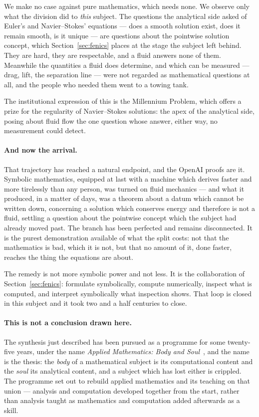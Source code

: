 \documentclass[11pt]{article}
\begin{document}
We make no case against pure mathematics, which needs none. We observe only what the division did to
\emph{this} subject. The questions the analytical side asked of Euler's and Navier--Stokes' equations
--- does a smooth solution exist, does it remain smooth, is it unique --- are questions about the
pointwise solution concept, which Section~\ref{sec:fenics} places at the stage the subject left
behind. They are hard, they are respectable, and a fluid answers none of them. Meanwhile the
quantities a fluid does determine, and which can be measured --- drag, lift, the separation line ---
were not regarded as mathematical questions at all, and the people who needed them went to a towing
tank.

The institutional expression of this is the Millennium Problem, which offers a prize for the
regularity of Navier--Stokes solutions: the apex of the analytical side, posing about fluid flow the
one question whose answer, either way, no measurement could detect.

\paragraph{And now the arrival.} That trajectory has reached a natural endpoint, and the OpenAI
proofs are it. Symbolic mathematics, equipped at last with a machine which derives faster and more
tirelessly than any person, was turned on fluid mechanics --- and what it produced, in a matter of
days, was a theorem about a datum which cannot be written down, concerning a solution which conserves
energy and therefore is not a fluid, settling a question about the pointwise concept which the
subject had already moved past. The branch has been perfected and remains disconnected. It is the
purest demonstration available of what the split costs: not that the mathematics is bad, which it is
not, but that no amount of it, done faster, reaches the thing the equations are about.

The remedy is not more symbolic power and not less. It is the collaboration of
Section~\ref{sec:fenics}: formulate symbolically, compute numerically, inspect what is computed, and
interpret symbolically what inspection shows. That loop is closed in this subject and it took two and
a half centuries to close.

\paragraph{This is not a conclusion drawn here.} The synthesis just described has been pursued as a
programme for some twenty-five years, under the name \emph{Applied Mathematics: Body and
Soul}~\cite{bodysoul,bsbooks}, and the name is the thesis: the \emph{body} of a mathematical subject
is its computational content and the \emph{soul} its analytical content, and a subject which has lost
either is crippled. The programme set out to rebuild applied mathematics and its teaching on that
union --- analysis and computation developed together from the start, rather than analysis taught as
mathematics and computation added afterwards as a skill.
\end{document}
